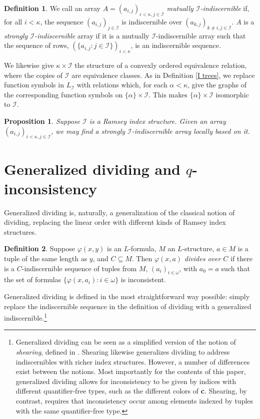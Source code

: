 \documentclass{article}
\newcommand{\calI}{\mathcal{I}}
\newcommand{\vphi}{\varphi}
\newtheorem{proposition}{Proposition}
\theoremstyle{definition}
\newtheorem{definition}{Definition}
\theoremstyle{definition}
\theoremstyle{definition}
\theoremstyle{definition}
\begin{document}
\begin{definition}
 We call an array $A=(a_{i,j})_{i<\kappa,j\in\calI}$ \textit{mutually $\calI$-indiscernible} if, for all $i<\kappa$, the sequence $(a_{i,j})_{j\in\calI}$ is indiscernible over $(a_{k,j})_{k\neq i, j\in\calI}$. $A$ is a \textit{strongly $\calI$-indiscernible} array if it is a mutually $\calI$-indiscernible array such that the sequence of rows, $(\{a_{i,j}\colon j\in\calI\})_{i<\kappa}$, is an indiscernible sequence. 
\end{definition}

We likewise give $\kappa\times \calI$ the structure of a convexly ordered equivalence relation, where the copies of $\calI$ are equivalence classes. As in Definition \ref{I trees}, we replace function symbols in $L_\calI$ with relations which, for each $\alpha<\kappa$, give the graphs of the corresponding function symbols on $\{\alpha\}\times\calI$. This makes $\{\alpha\}\times\calI$ isomorphic to $\calI$.

\begin{proposition}\label{array indiscernibility}
    Suppose $\calI$ is a Ramsey index structure. Given an array $(a_{i,j})_{i<\kappa,j\in\calI}$, we may find a strongly $\calI$-indiscernible array locally based on it.
\end{proposition}


\section{Generalized dividing and $q$-inconsistency}

Generalized dividing is, naturally, a generalization of the classical notion of dividing, replacing the linear order with different kinds of Ramsey index structures.

\begin{definition}\label{dividing defn}  
Suppose $\vphi(x,y)$ is an $L$-formula, $M$ an $L$-structure, $a\in M$ is a tuple of the same length as $y$, and $C\subseteq M$. Then $\vphi(x,a)$ \textit{divides over $C$} if there is a $C$-indiscernible sequence of tuples from $M$, $(a_i)_{i\in\omega}$, with $a_0=a$ such that the set of formulas $\{\vphi(x,a_i)\colon i\in\omega\}$ is inconsistent.
\end{definition}

Generalized dividing is defined in the most straightforward way possible: simply replace the indiscernible sequence in the definition of dividing with a generalized indiscernible.\footnote{Generalized dividing can be seen as a simplified version of the notion of \textit{shearing}, defined in \cite{malliaris_shelah_2021_separation_theorem}. Shearing likewise generalizes dividing to address indiscernibles with richer index structures. However, a number of differences exist between the notions. Most importantly for the contents of this paper, generalized dividing allows for inconsistency to be given by indices with different quantifier-free types, such as the different colors of \textbf{c}. Shearing, by contrast, requires that inconsistency occur among elements indexed by tuples with the same quantifier-free type.}
\end{document}
